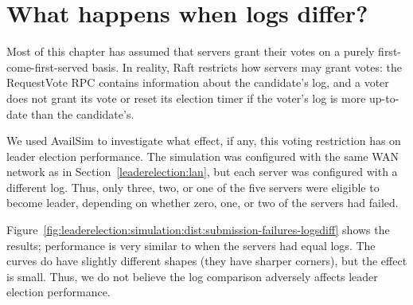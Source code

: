 \section{What happens when logs differ?}
\label{leaderelection:logsdiff}

Most of this chapter has assumed that servers grant their votes
on a purely first-come-first-served basis. In reality, Raft restricts
how servers may grant votes: the RequestVote RPC contains information
about the candidate's log, and a voter does not grant its vote or reset
its election timer if the voter's log is more up-to-date than the
candidate's.

We used AvailSim to investigate what effect, if any, this voting
restriction has on leader election performance. The simulation was
configured with the same WAN network as in
Section~\ref{leaderelection:lan}, but each server was configured with a
different log. Thus, only three, two, or one of the five servers were eligible to
become leader, depending on whether zero, one, or two of the servers had failed.



Figure~\ref{fig:leaderelection:simulation:dist:submission-failures-logsdiff}
shows the results; performance is very similar to when the servers had
equal logs. The curves do have slightly different shapes (they have
sharper corners), but the effect is small. Thus, we do not believe the
log comparison adversely affects leader election performance.


